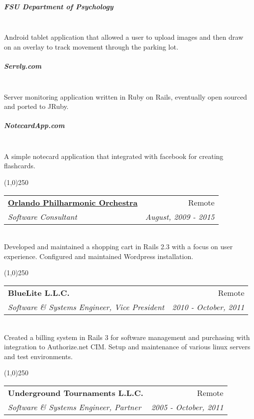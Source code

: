 \documentclass[a4paper,11pt,sans]{article}
\makeatletter
\newcommand{\ressubheading}[4]{
\begin{tabular*}{7.0in}{l@{\extracolsep{\fill}}r}
		\textbf{#1} & #2 \\
		\textit{#3} & \textit{#4} \\
\end{tabular*}\vspace{-6pt}}
\makeatother
\begin{document}
\subparagraph{FSU Department of Psychology} \hspace{5pt} \\

Android tablet application that allowed a user to upload images and then draw on an overlay to track movement through the parking lot.

\subparagraph{Servly.com} \hspace{5pt} \\

Server monitoring application written in Ruby on Rails, eventually open sourced and ported to JRuby.

\subparagraph{NotecardApp.com} \hspace{5pt} \\

A simple notecard application that integrated with facebook for creating flashcards.

\setlength{\parindent}{0pt}

\begin{center}
  \line(1,0){250}
\end{center}


\ressubheading{\href{http://orlandophil.org/}{Orlando Philharmonic Orchestra}}{Remote}{Software Consultant}{August, 2009 - 2015}

\hspace{5pt} \\

Developed and maintained a shopping cart in Rails 2.3 with a focus on user experience. Configured and maintained Wordpress installation.


\begin{center}
  \line(1,0){250}
\end{center}


\ressubheading{BlueLite L.L.C.}{Remote}{Software \& Systems Engineer, Vice President}{2010 - October, 2011}

\hspace{5pt} \\

Created a billing system in Rails 3 for software management and purchasing with integration to Authorize.net CIM.
Setup and maintenance of various linux servers and test environments.


\begin{center}
  \line(1,0){250}
\end{center}

\ressubheading{Underground Tournaments L.L.C.}{Remote}{Software \& Systems Engineer, Partner}{2005 - October, 2011}
\end{document}
